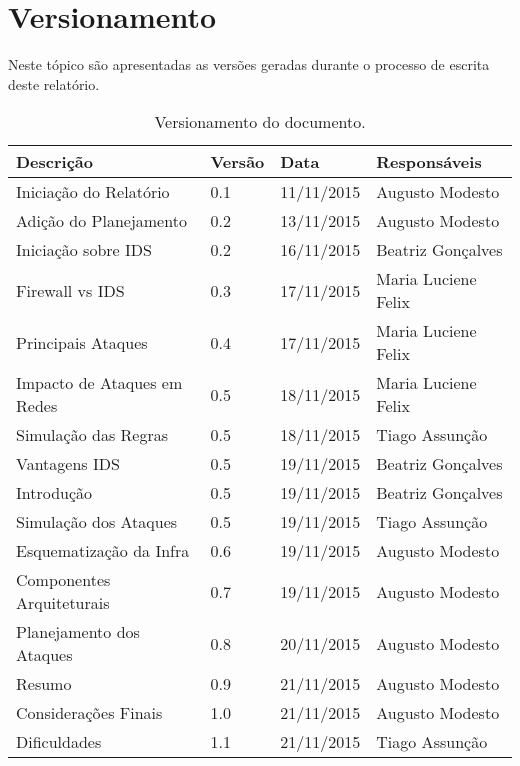 \chapter[Versionamento]{Versionamento}
\label{chap:versionamento}
	Neste tópico são apresentadas as versões geradas durante o processo de escrita deste relatório.

	\label{subsubsec:versionamento_talbe}
		\begin{table}[h]
			\centering
			\begin{tabular}{|p{6cm}|p{1.5cm}|p{2.5cm}|p{4cm}|}

				\hline

				Descrição & Versão & Data & Responsáveis \\ \hline
				Iniciação do Relatório & 0.1 & 11/11/2015 & Augusto Modesto \\ \hline
				Adição do Planejamento & 0.2 & 13/11/2015 & Augusto Modesto \\ \hline
				Iniciação sobre IDS & 0.2 & 16/11/2015 & Beatriz Gonçalves \\ \hline
				Firewall vs IDS & 0.3 & 17/11/2015 & Maria Luciene Felix \\ \hline
				Principais Ataques & 0.4 & 17/11/2015 & Maria Luciene Felix \\ \hline
				Impacto de Ataques em Redes & 0.5 & 18/11/2015 & Maria Luciene Felix \\ \hline
				Simulação das Regras & 0.5 & 18/11/2015 & Tiago Assunção\\ \hline
				Vantagens IDS & 0.5 & 19/11/2015 & Beatriz Gonçalves \\ \hline
				Introdução & 0.5 & 19/11/2015 & Beatriz Gonçalves \\ \hline
				Simulação dos Ataques & 0.5 & 19/11/2015 & Tiago Assunção \\ \hline
				Esquematização da Infra & 0.6 & 19/11/2015 & Augusto Modesto \\ \hline
				Componentes Arquiteturais & 0.7 & 19/11/2015 & Augusto Modesto \\ \hline
				Planejamento dos Ataques & 0.8 & 20/11/2015 & Augusto Modesto \\ \hline
				Resumo & 0.9 & 21/11/2015 & Augusto Modesto \\ \hline
				Considerações Finais & 1.0 & 21/11/2015 & Augusto Modesto \\ \hline
				Dificuldades & 1.1 & 21/11/2015 & Tiago Assunção \\ \hline


			\end{tabular}
			\caption[Versionamento do Documento]{Versionamento do documento.}
			\label{tab:versionamento_tabl}
		\end{table}
